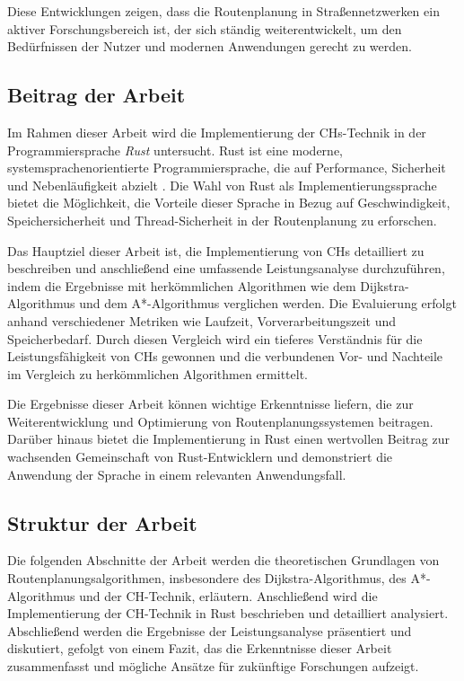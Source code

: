 Diese Entwicklungen zeigen, dass die Routenplanung in Straßennetzwerken
ein aktiver Forschungsbereich ist, der sich ständig weiterentwickelt, um den Bedürfnissen der Nutzer
und modernen Anwendungen gerecht zu werden.

\subsection{Beitrag der Arbeit}
Im Rahmen dieser Arbeit wird die Implementierung der \acp{CH}-Technik in der Programmiersprache
\emph{Rust} untersucht. Rust ist eine moderne, systemsprachenorientierte Programmiersprache, die auf
Performance, Sicherheit und Nebenläufigkeit abzielt \cite{rust.book}. Die Wahl von Rust als
Implementierungssprache bietet die Möglichkeit, die Vorteile dieser Sprache in Bezug auf
Geschwindigkeit, Speichersicherheit und Thread-Sicherheit in der Routenplanung zu erforschen.

Das Hauptziel dieser Arbeit ist, die Implementierung von \acp{CH} detailliert zu beschreiben und
anschließend eine umfassende Leistungsanalyse durchzuführen, indem die Ergebnisse mit herkömmlichen
Algorithmen wie dem Dijkstra-Algorithmus und dem A*-Algorithmus verglichen werden. Die Evaluierung
erfolgt anhand verschiedener Metriken wie Laufzeit, Vorverarbeitungszeit und Speicherbedarf.
Durch diesen Vergleich wird ein tieferes Verständnis für die Leistungsfähigkeit von \acp{CH}
gewonnen und die verbundenen Vor- und Nachteile im Vergleich zu herkömmlichen Algorithmen ermittelt.

Die Ergebnisse dieser Arbeit können wichtige Erkenntnisse liefern, die zur
Weiterentwicklung und Optimierung von Routenplanungssystemen beitragen. Darüber
hinaus bietet die Implementierung in Rust einen wertvollen Beitrag zur
wachsenden Gemeinschaft von Rust-Entwicklern und demonstriert die Anwendung der
Sprache in einem relevanten Anwendungsfall.

\subsection{Struktur der Arbeit}
Die folgenden Abschnitte der Arbeit werden die theoretischen Grundlagen von
Routenplanungsalgorithmen, insbesondere des Dijkstra-Algorithmus, des A*-Algorithmus
und der CH-Technik, erläutern. Anschließend wird die Implementierung der CH-Technik in
Rust beschrieben und detailliert analysiert. Abschließend werden die Ergebnisse der
Leistungsanalyse präsentiert und diskutiert, gefolgt von einem Fazit, das die Erkenntnisse
dieser Arbeit zusammenfasst und mögliche Ansätze für zukünftige Forschungen aufzeigt.
